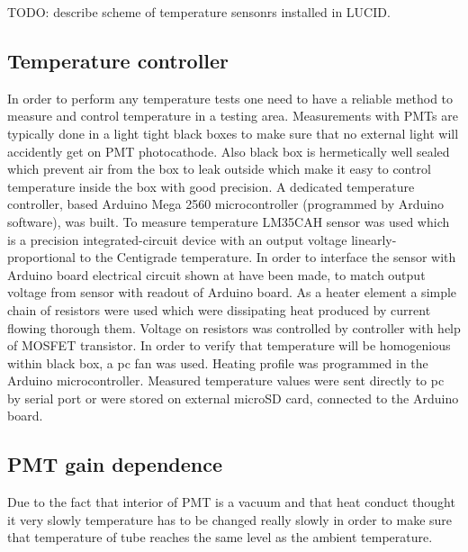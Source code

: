 

TODO: describe scheme of temperature sensonrs installed in LUCID.

\subsection{Temperature controller}
\label{subsec:tempController}

In order to perform any temperature tests one need to have a reliable method to measure and control temperature in a testing area.
Measurements with PMTs are typically done in a light tight black boxes to make sure that no external light will accidently get on PMT photocathode.
Also black box is hermetically well sealed which prevent air from the box to leak outside which make it easy to control temperature inside the box with good precision.
A dedicated temperature controller, based Arduino Mega 2560 microcontroller
(programmed by Arduino software), was built.
To measure temperature LM35CAH sensor was used which is a precision integrated-circuit device with an output voltage linearly-proportional to the Centigrade temperature.
In order to interface the sensor with 
Arduino board electrical circuit shown at  have been made, 
to match output voltage from sensor with readout of Arduino board.
As a heater element a simple chain of resistors were used which were dissipating heat produced by current flowing thorough them. 
Voltage on resistors was controlled by controller with help of MOSFET transistor. In order to verify that temperature will be homogenious within black box,
a pc fan was used. Heating profile was programmed in the Arduino microcontroller.
Measured temperature values were sent directly to pc by serial port or were stored on external microSD card, connected to the Arduino board.

\subsection{PMT gain dependence}
\label{subsec:pmtGainTempDep}


Due to the fact that interior of PMT is a vacuum and that heat conduct thought it very slowly temperature has to be changed really slowly in order to make sure that temperature of tube
reaches the same level as the ambient temperature.

